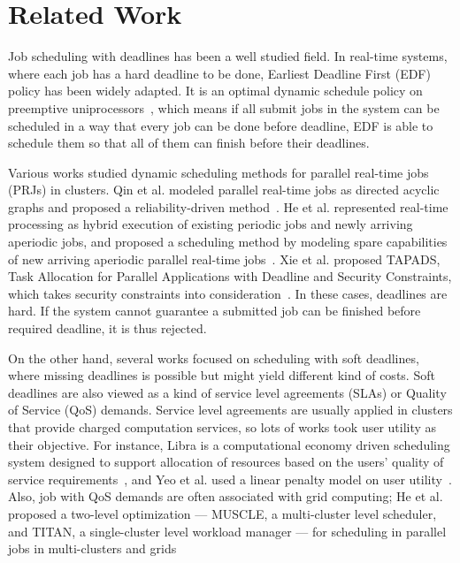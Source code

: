 \chapter{Related Work}\label{sec:related}

Job scheduling with deadlines has been a well studied field.
In real-time systems, where each job has a hard deadline to be done,
Earliest Deadline First (EDF) policy has been widely adapted.
It is an optimal dynamic schedule policy on preemptive
uniprocessors~\cite{cite:pinedo2012scheduling}, which means if all
submit jobs in the system can be scheduled in a way that every job can
be done before deadline, EDF is able to schedule them so that all of
them can finish before their deadlines.

Various works studied dynamic scheduling methods for parallel real-time
jobs (PRJs) in clusters.
Qin et al. modeled parallel real-time jobs as directed acyclic graphs
and proposed a reliability-driven
method~\cite{cite:qin-reliability-driven}.
He et al. represented real-time processing as hybrid execution of
existing periodic jobs and newly arriving aperiodic jobs, and proposed a
scheduling method by modeling spare capabilities of new arriving
aperiodic parallel real-time jobs~\cite{cite:he-spare-capabilities}.
Xie et al. proposed TAPADS, Task Allocation for Parallel Applications
with Deadline and Security Constraints, which takes security constraints
into consideration~\cite{cite:xie-TAPADS,cite:xie2008security}.
In these cases, deadlines are hard.
If the system cannot guarantee a submitted job can be finished before
required deadline, it is thus rejected.

On the other hand, several works focused on scheduling with soft
deadlines, where missing deadlines is possible but might yield different
kind of costs.
Soft deadlines are also viewed as a kind of service level agreements
(SLAs) or Quality of Service (QoS) demands.
Service level agreements are usually applied in clusters that provide
charged computation services, so lots of works took user utility as
their objective.
For instance, Libra is a computational economy driven scheduling system
designed to support allocation of resources based on the users' quality
of service requirements~\cite{cite:libra}, and Yeo et al. used a linear
penalty model on user utility~\cite{cite:yeo-SLA-penalty}.
Also, job with QoS demands are often associated with grid computing; He
et al. proposed a two-level optimization --- MUSCLE, a multi-cluster
level scheduler, and TITAN, a single-cluster level workload manager ---
for scheduling in parallel jobs in multi-clusters and
grids~\cite{cite:he-muscle-titan}

